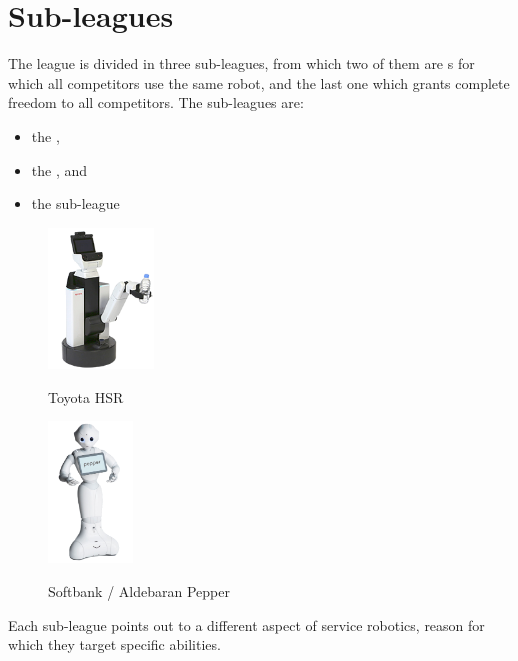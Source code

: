 \section{Sub-leagues}
\label{sec:sub-leagues}

The  league is divided in three sub-leagues, from which two of them are s for which all competitors use the same robot, and the last one which grants complete freedom to all competitors. The sub-leagues are:
\begin{itemize}
  \item the ,
  \item the , and
  \item the  sub-league
\end{itemize}

\begin{figure}
	\centering
	\vspace{-30pt}
	\includegraphics[width=0.25\textwidth]{images/toyota_hsr.png}
	\vspace{-10pt}
	\label{fig:toyotaHSR}
	\caption{Toyota HSR}
	\includegraphics[width=0.20\textwidth]{images/softbank_pepper.png}
	\vspace{-10pt}
	\label{fig:softbank-pepper}
	\caption{Softbank / Aldebaran Pepper}
\end{figure}
Each sub-league points out to a different aspect of service robotics, reason for which they target specific abilities.


